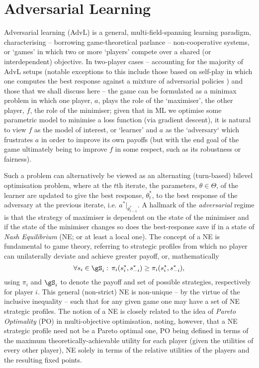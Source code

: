 \section{Adversarial Learning}\label{sec:adv-learning}
Adversarial learning (AdvL) is a general, multi-field-spanning learning paradigm, characterising --
borrowing game-theoretical parlance -- non-cooperative systems, or `games' in which two or more
`players' compete over a shared (or interdependent) objective. 
%
In two-player cases -- accounting for the majority of AdvL setups (notable exceptions to this
include those based on self-play in which one computes the best response against a mixture of
adversarial policies \citep{silver2017mastering, vinyals2019grandmaster}) and those that we shall
discuss here -- the game can be formulated as a minimax problem in which one player, \(a\), plays
the role of the `maximiser', the other player, \(f\), the role of the minimiser; given that in ML
we optimise some parametric model to minimise a loss function (via gradient descent), it is natural
to view \(f\) as the model of interest, or `learner' and \(a\) as the `adversary` which frustrates
\(a\) in order to improve its own payoffs (but with the end goal of the game ultimately being to
improve \(f\) in some respect, such as its robustness or fairness).
%

Such a problem can alternatively be viewed as an alternating (turn-based) bilevel optimisation
problem, where at the \(t\)th iterate, the parameters, \(\theta \in \Theta\), of the learner are
updated to give the best response, \(\theta^{\ast}_t\), to the best response of the adversary at
the previous iterate, i.e. \(a^\ast|_{\theta^\ast_{t-1}}\).
%
A hallmark of the \emph{adversarial} regime is that the strategy of maximiser is dependent on the
state of the minimiser and if the state of the minimiser changes so does the best-response save if
in a state of \emph{Nash Equilibrium} (NE; or at least a local one).  
%
The concept of a NE is fundamental to game theory, referring to strategic profiles from which no
player can unilaterally deviate and achieve greater payoff, or, mathematically
%
\begin{equation}
  \forall s_i \in \gS_i:\, \pi_i ( s^\ast_i, s^\ast_{-i} ) \ge \pi_i( s^\ast_i, s^\ast_{-i} ),
\end{equation}
%
using \(\pi_i\) and \(\gS_i\) to denote the payoff and set of possible strategies, respectively for
player \(i\).
%
This general (non-strict) NE is non-unique -- by the virtue of the inclusive inequality -- such
that for any given game one may have a set of NE strategic profiles.
%
The notion of a NE is closely related to the idea of \emph{Pareto Optimality} (PO) in
multi-objective optimisation, noting, however, that a NE strategic profile need not be a Pareto
optimal one, PO being defined in terms of the maximum theoretically-achievable utility for each
player (given the utilities of every other player), NE solely in terms of the relative utilities of
the players and the resulting fixed points.

